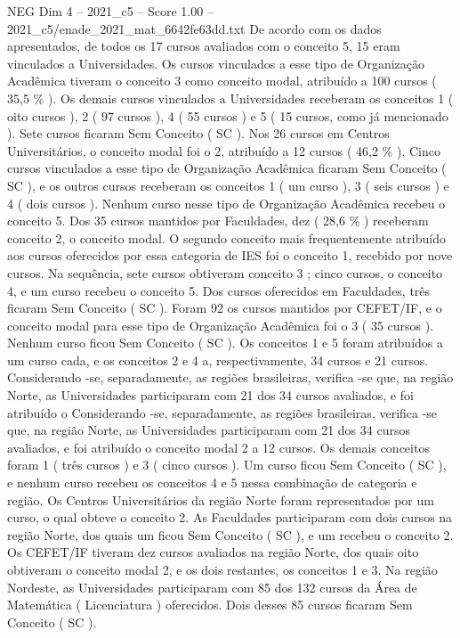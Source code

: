 \begin{textsample}{NEG Dim 4 – 2021\_c5 – Score 1.00 – 2021\_c5/enade\_2021\_mat\_6642fe63dd.txt}
De acordo com os dados apresentados, de todos os 17 cursos avaliados com o conceito 5, 15 eram vinculados a Universidades.
Os cursos vinculados a esse tipo de Organização Acadêmica tiveram o conceito 3 como conceito modal, atribuído a 100 cursos ( 35,5 \% ).
Os demais cursos vinculados a Universidades receberam os conceitos 1 ( oito cursos ), 2 ( 97 cursos ), 4 ( 55 cursos ) e 5 ( 15 cursos, como já mencionado ).
Sete cursos ficaram Sem Conceito ( SC ).
Nos 26 cursos em Centros Universitários, o conceito modal foi o 2, atribuído a 12 cursos ( 46,2 \% ).
Cinco cursos vinculados a esse tipo de Organização Acadêmica ficaram Sem Conceito ( SC ), e os outros cursos receberam os conceitos 1 ( um curso ), 3 ( seis cursos ) e 4 ( dois cursos ).
Nenhum curso nesse tipo de Organização Acadêmica recebeu o conceito 5.
Dos 35 cursos mantidos por Faculdades, dez ( 28,6 \% ) receberam conceito 2, o conceito modal.
O segundo conceito mais frequentemente atribuído aos cursos oferecidos por essa categoria de IES foi o conceito 1, recebido por nove cursos.
Na sequência, sete cursos obtiveram conceito 3 ; cinco cursos, o conceito 4, e um curso recebeu o conceito 5.
Dos cursos oferecidos em Faculdades, três ficaram Sem Conceito ( SC ).
Foram 92 os cursos mantidos por CEFET/IF, e o conceito modal para esse tipo de Organização Acadêmica foi o 3 ( 35 cursos ).
Nenhum curso ficou Sem Conceito ( SC ).
Os conceitos 1 e 5 foram atribuídos a um curso cada, e os conceitos 2 e 4 a, respectivamente, 34 cursos e 21 cursos.
Considerando -se, separadamente, as regiões brasileiras, verifica -se que, na região Norte, as Universidades participaram com 21 dos 34 cursos avaliados, e foi atribuído o Considerando -se, separadamente, as regiões brasileiras, verifica -se que, na região Norte, as Universidades participaram com 21 dos 34 cursos avaliados, e foi atribuído o conceito modal 2 a 12 cursos.
Os demais conceitos foram 1 ( três cursos ) e 3 ( cinco cursos ).
Um curso ficou Sem Conceito ( SC ), e nenhum curso recebeu os conceitos 4 e 5 nessa combinação de categoria e região.
Os Centros Universitários da região Norte foram representados por um curso, o qual obteve o conceito 2.
As Faculdades participaram com dois cursos na região Norte, dos quais um ficou Sem Conceito ( SC ), e um recebeu o conceito 2.
Os CEFET/IF tiveram dez cursos avaliados na região Norte, dos quais oito obtiveram o conceito modal 2, e os dois restantes, os conceitos 1 e 3.
Na região Nordeste, as Universidades participaram com 85 dos 132 cursos da Área de Matemática ( Licenciatura ) oferecidos.
Dois desses 85 cursos ficaram Sem Conceito ( SC ).

\end{textsample}
